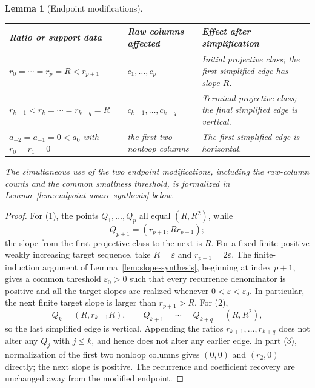 \documentclass{amsart}
\numberwithin{equation}{section}
\newtheorem{lemma}[theorem]{Lemma}
\theoremstyle{definition}
\theoremstyle{remark}
\begin{document}
\begin{lemma}[Endpoint modifications]
\begin{center}
\begin{tabularx}{\textwidth}{@{}>{\raggedright\arraybackslash}X>{\raggedright\arraybackslash}p{}>{\raggedright\arraybackslash}X@{}}
\toprule
Ratio or support data & Raw columns affected & Effect after simplification \\
\midrule
$r_0=\cdots=r_p=R<r_{p+1}$
& $c_1,\ldots,c_p$
& Initial projective class; the first simplified edge has slope $R$. \\
$r_{k-1}<r_k=\cdots=r_{k+q}=R$
& $c_{k+1},\ldots,c_{k+q}$
& Terminal projective class; the final simplified edge is vertical. \\
$a_{-2}=a_{-1}=0<a_0$ with $r_0=r_1=0$
& the first two nonloop columns
& The first simplified edge is horizontal. \\
\bottomrule
\end{tabularx}
\end{center}
The simultaneous use of the two endpoint modifications, including the raw-column counts and the common smallness threshold, is formalized in Lemma~\ref{lem:endpoint-aware-synthesis} below.
\end{lemma}

\begin{proof}
For (1), the points $Q_1,\ldots,Q_p$ all equal $(R,R^2)$, while
\[
 Q_{p+1}=(r_{p+1},Rr_{p+1});
\]
the slope from the first projective class to the next is $R$.  For a fixed finite positive weakly increasing target sequence, take $R=\varepsilon$ and $r_{p+1}=2\varepsilon$.  The finite-induction argument of Lemma~\ref{lem:slope-synthesis}, beginning at index $p+1$, gives a common threshold $\varepsilon_0>0$ such that every recurrence denominator is positive and all the target slopes are realized whenever $0<\varepsilon<\varepsilon_0$.  In particular, the next finite target slope is larger than $r_{p+1}>R$.  For (2),
\[
 Q_k=(R,r_{k-1}R),
 \qquad
 Q_{k+1}=\cdots=Q_{k+q}=(R,R^2),
\]
so the last simplified edge is vertical.  Appending the ratios $r_{k+1},\ldots,r_{k+q}$ does not alter any $Q_j$ with $j\le k$, and hence does not alter any earlier edge.  In part (3), normalization of the first two nonloop columns gives $(0,0)$ and $(r_2,0)$ directly; the next slope is positive.  The recurrence and coefficient recovery are unchanged away from the modified endpoint.
\end{proof}
\end{document}
